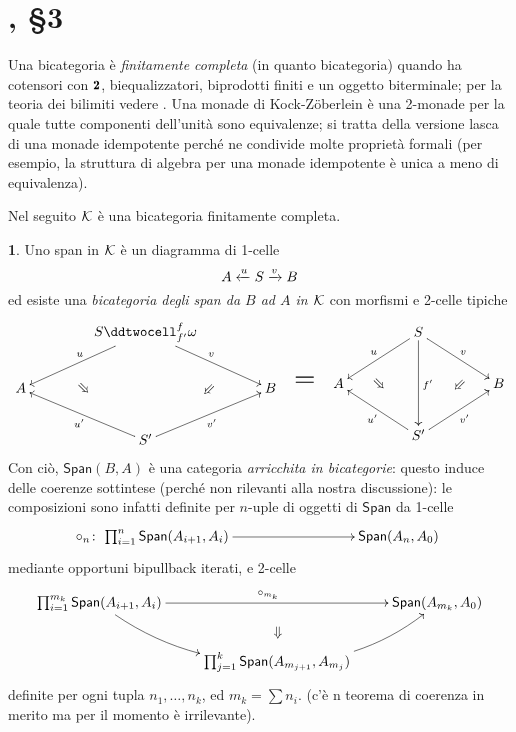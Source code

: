 \documentclass[a4paper,10pt]{amsart}
\theoremstyle{definition}
\newtheorem{prg}{}[section]
\begin{document}
\section{\cite{street1980fibrations}, §3}
Una bicategoria è \emph{finitamente completa} (in quanto bicategoria) quando ha cotensori con $\due$, biequalizzatori, biprodotti finiti e un oggetto biterminale; per la teoria dei bilimiti vedere \cite{makkai1989accessible}. Una monade di Kock-Z\"oberlein è una 2-monade per la quale tutte componenti dell'unità sono equivalenze; si tratta della versione lasca di una monade idempotente perché ne condivide molte proprietà formali (per esempio, la struttura di algebra per una monade idempotente è unica a meno di equivalenza).

Nel seguito $\mathcal{K}$ è una bicategoria finitamente completa.
\begin{prg}
Uno span in $\mathcal{K}$ è un diagramma di 1-celle
\[
A \xleftarrow{u}S \xrightarrow{v} B
\]
ed esiste una \emph{bicategoria degli span da $B$ ad $A$ in $\mathcal{K}$} con morfismi e 2-celle tipiche
\[
\vcenter{
	\xymatrix@C=1.5cm{
	&S\ar[dr]^v\ar[dl]_u\ddtwocell_{f'}^f{\omega}&\\
	A \ar@{}[r]|{\Searrow}&& B\ar@{}[l]|\Swarrow\\
	& S'\ar[ur]_{v'}\ar[ul]^{u'} & 
	}
}
\quad
\text{\huge =}
\quad
\vcenter{
	\xymatrix@C=1.5cm{
	&S\ar[dr]^v\ar[dl]_u\ar [dd]^{f'}&\\
	A \ar@{}[r]|{\Searrow}&& B\ar@{}[l]|\Swarrow\\
	& S'\ar[ur]_{v'}\ar[ul]^{u'} & 
	}
}
\]
Con ciò, $\textsf{Span}(B,A)$ è una categoria \emph{arricchita in bicategorie}: questo induce delle coerenze sottintese (perché non rilevanti alla nostra discussione): le composizioni sono infatti definite per $n$-uple di oggetti di $\textsf{Span}$ da 1-celle
\[
\circ_n \colon
\xymatrix{
	**[l] \prod_{i=1}^n \textsf{Span}(A_{i+1},A_i) \ar[r] & **[r] \textsf{Span}(A_n, A_0)
}
\]
mediante opportuni bipullback iterati, e 2-celle
\[
\xymatrix{
\prod_{i=1}^{m_k} \textsf{Span}(A_{i+1},A_i) \ar@/_1pc/[dr]\ar[rr]^{\circ_{m_k}}&& \textsf{Span}(A_{m_k}, A_0)\\ 
& \prod_{j=1}^k \textsf{Span}(A_{m_{j+1}}, A_{m_j}) \ar@/_1pc/[ur]\ar@{}[u]|\Sarrow
}
\]
definite per ogni tupla $n_1,\dots, n_k$, ed $m_k = \sum n_i$. (c'è n teorema di coerenza in merito ma per il momento è irrilevante).
\end{prg}
\end{document}
